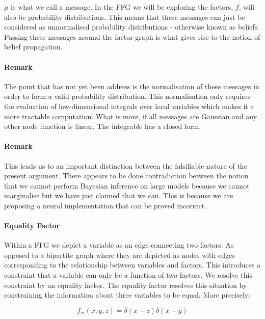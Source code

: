 \documentclass{article}
\begin{document}
$\mu$ is what we call a message. In the FFG we will be exploring the factors, $f$, will also be probability distributions. This means that these messages can just be considered as unnormalised probability distributions - otherwise known as beliefs. Passing these messages around the factor graph is what gives rise to the notion of belief propagation.


\paragraph{Remark} The point that has not yet been address is the normalisation of these messages in order to form a valid probability distribution. This normalisation only requires the evaluation of low-dimensional integrals over local variables which makes it a more tractable computation. What is more, if all messages are Gaussian and any other node function is linear. The integrable has a closed form. \citep{bagaev2021reactive}


\paragraph{Remark} This leads us to an important distinction between the falsifiable nature of the present argument. There appears to be done contradiction between the notion that we cannot perform Bayesian inference on large models because we cannot marginalise but we have just claimed that we can. This is because we are proposing a neural implementation that can be proved incorrect.

\paragraph{Equality Factor} Within a FFG we depict a variable as an edge connecting two factors. As opposed to a bipartite graph where they are depicted as nodes with edges corresponding to the relationship between variables and factors. This introduces a constraint that a variable can only be a function of two factors. We resolve this constraint by an equality factor. The equality factor resolves this situation by constraining the information about three variables to be equal. 	\citep{cox2019factor} More precisely:

\begin{equation}\label{eq:equality_factor}
	f_{=}(x, y, z) = \delta(x - z)\delta(x - y)
\end{equation}
\end{document}
